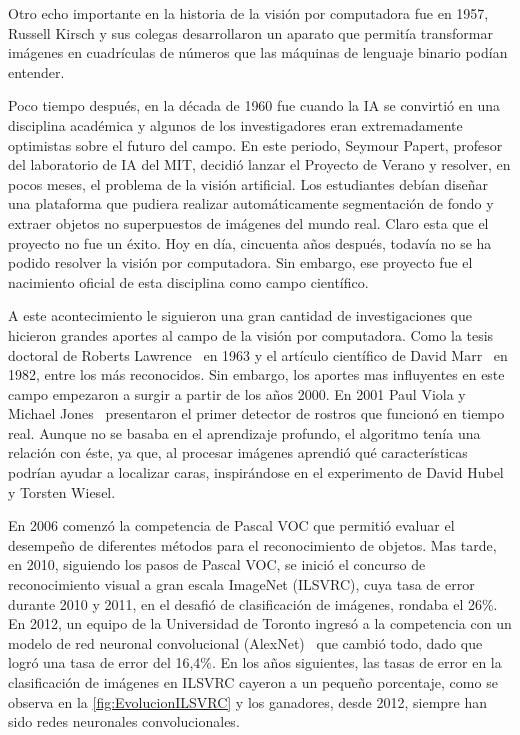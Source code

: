 Otro echo importante en la historia de la visión por computadora fue en 1957, Russell Kirsch y sus colegas desarrollaron un aparato que permitía transformar imágenes en cuadrículas de números que las máquinas de lenguaje binario podían entender. 

Poco tiempo después, en la década de 1960 fue cuando la IA se convirtió en una disciplina académica y algunos de los investigadores eran extremadamente optimistas sobre el futuro del campo. En este periodo, Seymour Papert, profesor del laboratorio de IA del MIT, decidió lanzar el Proyecto de Verano y resolver, en pocos meses, el problema de la visión artificial. Los estudiantes debían diseñar una plataforma que pudiera realizar automáticamente segmentación de fondo y extraer objetos no superpuestos de imágenes del mundo real. Claro esta que el proyecto no fue un éxito.  Hoy en día, cincuenta años después, todavía no se ha podido resolver la visión por computadora. Sin embargo, ese proyecto fue el nacimiento oficial de esta disciplina como campo científico. 

A este acontecimiento le siguieron una gran cantidad de investigaciones que hicieron grandes aportes al campo de la visión por computadora. Como la tesis doctoral de Roberts Lawrence~\cite{roberts1963machine} en 1963 y el artículo científico de David Marr~\cite{vision_marr} en 1982, entre los más reconocidos. Sin embargo, los aportes mas influyentes en este campo empezaron a surgir a partir de los años 2000. En 2001 Paul Viola y Michael Jones~\cite{viola2001rapid} presentaron el primer detector de rostros que funcionó en tiempo real. Aunque no se basaba en el aprendizaje profundo, el algoritmo tenía una relación con éste, ya que, al procesar imágenes aprendió qué características podrían ayudar a localizar caras, inspirándose en el experimento de David Hubel y Torsten Wiesel. 

En 2006 comenzó la competencia de Pascal VOC que permitió evaluar el desempeño de diferentes métodos para el reconocimiento de objetos. Mas tarde, en 2010, siguiendo los pasos de Pascal VOC, se inició el concurso de reconocimiento visual a gran escala ImageNet (ILSVRC), cuya tasa de error durante 2010 y 2011, en el desafió de clasificación de imágenes, rondaba el 26\%.  En 2012, un equipo de la Universidad de Toronto ingresó a la competencia con un modelo de red neuronal convolucional (AlexNet)~\cite{krizhevsky2012imagenet} que cambió todo, dado que logró una tasa de error del 16,4\%. En los años siguientes, las tasas de error en la clasificación de imágenes en ILSVRC cayeron a un pequeño porcentaje, como se observa en la \autoref{fig:EvolucionILSVRC} y los ganadores, desde 2012, siempre han sido redes neuronales convolucionales.

